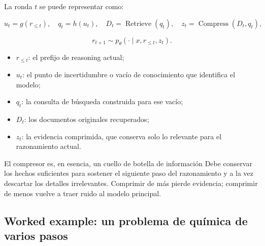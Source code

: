 \documentclass[a4paper]{article}
\begin{document}
La ronda $t$ se puede representar como:

$$
u_t=g(r_{\le t}),\quad
q_t=h(u_t),\quad
D_t=\operatorname{Retrieve}(q_t),\quad
z_t=\operatorname{Compress}(D_t,q_t),
$$

$$
r_{t+1}\sim p_\theta(\cdot\mid x,r_{\le t},z_t).
$$

\begin{itemize}
    \item $r_{\le t}$: el prefijo de reasoning actual;
    \item $u_t$: el punto de incertidumbre o vacío de conocimiento que identifica el modelo;
    \item $q_t$: la consulta de búsqueda construida para ese vacío;
    \item $D_t$: los documentos originales recuperados;
    \item $z_t$: la evidencia comprimida, que conserva solo lo relevante para el razonamiento actual.
\end{itemize}



\begin{knowledgebox}{El compresor es, en esencia, un cuello de botella de información}
Debe conservar los hechos suficientes para sostener el siguiente paso del razonamiento y a la vez descartar los detalles irrelevantes. Comprimir de más pierde evidencia; comprimir de menos vuelve a traer ruido al modelo principal.
\end{knowledgebox}

\subsection{Worked example: un problema de química de varios pasos}

\end{document}
